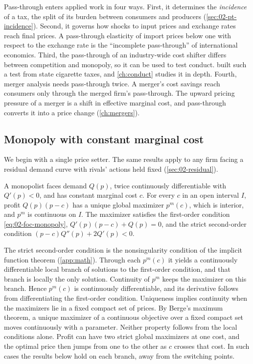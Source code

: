 Pass-through enters applied work in four ways. First, it determines the \emph{incidence} of a tax, the split of
its burden between consumers and producers (\cref{sec:02-pt-incidence}). Second, it governs how shocks to input
prices and exchange rates reach final prices. A pass-through elasticity of import prices below one with respect
to the exchange rate is the ``incomplete pass-through'' of international economics. Third, the pass-through of
an industry-wide cost shifter differs between competition and monopoly, so it can be used to test conduct.
\citet{Sumner1981} built such a test from state cigarette taxes, and \cref{ch:conduct} studies it in depth.
Fourth, merger analysis needs pass-through twice. A merger's cost savings reach consumers only through the
merged firm's pass-through. The upward pricing pressure of a merger is a shift in effective marginal cost, and
pass-through converts it into a price change (\cref{ch:mergers}).

\subsection{Monopoly with constant marginal cost}\label{sec:02-pt-monopoly}

We begin with a single price setter. The same results apply to any firm facing a residual demand curve with
rivals' actions held fixed (\cref{sec:02-residual}).

\begin{assumption}\label{ass:02-pt-monopoly}
A monopolist faces demand $Q(p)$, twice continuously differentiable with $Q'(p) < 0$, and has constant marginal
cost $c$. For every $c$ in an open interval $I$, profit $Q(p)(p - c)$ has a unique global maximizer $p^m(c)$,
which is interior, and $p^m$ is continuous on $I$. The maximizer satisfies the first-order condition
\eqref{eq:02-foc-monopoly}, $Q'(p)(p - c) + Q(p) = 0$, and the strict second-order condition $(p - c)Q''(p) +
2Q'(p) < 0$.
\end{assumption}

The strict second-order condition is the nonsingularity condition of the implicit function theorem
(\cref{app:math}). Through each $p^m(c)$ it yields a continuously differentiable local branch of solutions to the
first-order condition, and that branch is locally the only solution. Continuity of $p^m$ keeps the maximizer on
this branch. Hence $p^m(c)$ is continuously differentiable, and its derivative follows from differentiating the
first-order condition. Uniqueness implies continuity when the maximizers lie in a fixed compact set of prices. By
Berge's maximum theorem, a unique maximizer of a continuous objective over a fixed compact set moves continuously
with a parameter. Neither property follows from the local conditions alone. Profit can have two strict global
maximizers at one cost, and the optimal price then jumps from one to the other as $c$ crosses that cost. In such
cases the results below hold on each branch, away from the switching points.

